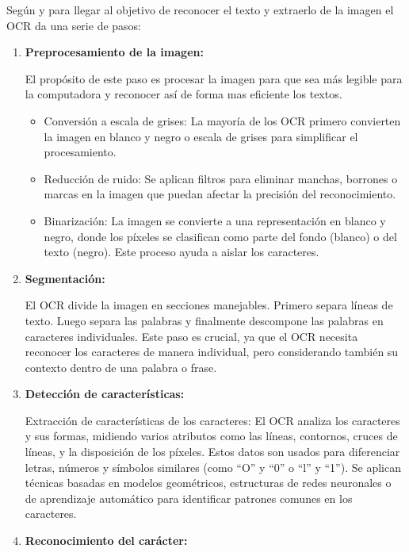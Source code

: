 Según \cite{TesseractOCR} y \cite{OcropusOCR} para llegar al objetivo de reconocer el texto y extraerlo de la imagen el OCR da una serie de pasos:
\begin{enumerate}
	\item \textbf{Preprocesamiento de la imagen:}
	
	El propósito de este paso es procesar la imagen para que sea más legible para la computadora y reconocer así de forma mas eficiente los textos.
	\begin{itemize}
		\item Conversión a escala de grises: La mayoría de los OCR primero convierten la imagen en blanco y negro o escala de grises para simplificar el procesamiento.
		\item Reducción de ruido: Se aplican filtros para eliminar manchas, borrones o marcas en la imagen que puedan afectar la precisión del reconocimiento.
		\item Binarización: La imagen se convierte a una representación en blanco y negro, donde los píxeles se clasifican como parte del fondo (blanco) o del texto (negro). Este proceso ayuda a aislar los caracteres.
	\end{itemize}
	
	\item \textbf{Segmentación:}
	
	El OCR divide la imagen en secciones manejables. Primero separa líneas de texto.  Luego separa las palabras y finalmente descompone las palabras en caracteres individuales. Este paso es crucial, ya que el OCR necesita reconocer los caracteres de manera individual, pero considerando también su contexto dentro de una palabra o frase.
	
	\item \textbf{Detección de características:}
	
	Extracción de características de los caracteres: El OCR analiza los caracteres y sus formas, midiendo varios atributos como las líneas, contornos, cruces de líneas, y la disposición de los píxeles. Estos datos son usados para diferenciar letras, números y símbolos similares (como ``O'' y ``0'' o ``l'' y ``1'').
	Se aplican técnicas basadas en modelos geométricos, estructuras de redes neuronales o de aprendizaje automático para identificar patrones comunes en los caracteres.
	
	\item \textbf{Reconocimiento del carácter:}
	

\end{enumerate}
